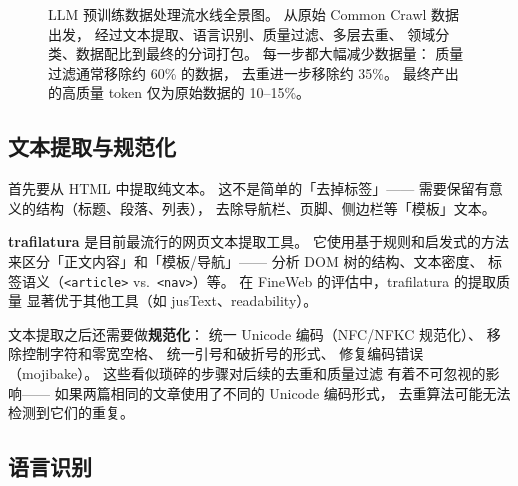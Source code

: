 \begin{figure}[htbp]
\caption{
  LLM 预训练数据处理流水线全景图。
  从原始 Common Crawl 数据出发，
  经过文本提取、语言识别、质量过滤、多层去重、
  领域分类、数据配比到最终的分词打包。
  每一步都大幅减少数据量：
  质量过滤通常移除约 60\% 的数据，
  去重进一步移除约 35\%。
  最终产出的高质量 token 仅为原始数据的 10--15\%。
}
\label{fig:data-pipeline}
\end{figure}

\subsection{文本提取与规范化}

首先要从 HTML 中提取纯文本。
这不是简单的「去掉标签」——
需要保留有意义的结构（标题、段落、列表），
去除导航栏、页脚、侧边栏等「模板」文本。

\textbf{trafilatura} 是目前最流行的网页文本提取工具。
它使用基于规则和启发式的方法
来区分「正文内容」和「模板/导航」——
分析 DOM 树的结构、文本密度、
标签语义（\texttt{<article>} vs.\ \texttt{<nav>}）等。
在 FineWeb 的评估中，trafilatura 的提取质量
显著优于其他工具（如 jusText、readability）。

文本提取之后还需要做\textbf{规范化}：
统一 Unicode 编码（NFC/NFKC 规范化）、
移除控制字符和零宽空格、
统一引号和破折号的形式、
修复编码错误（mojibake）。
这些看似琐碎的步骤对后续的去重和质量过滤
有着不可忽视的影响——
如果两篇相同的文章使用了不同的 Unicode 编码形式，
去重算法可能无法检测到它们的重复。

\subsection{语言识别}

